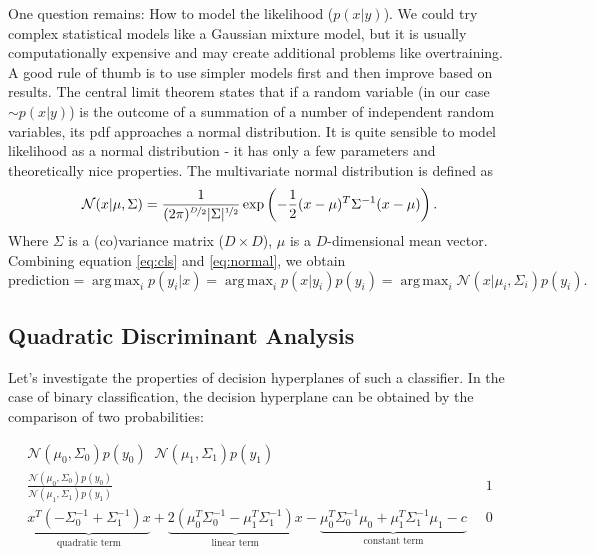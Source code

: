 \documentclass{article}
\DeclareMathOperator*{\argmax}{arg\,max}
\DeclareMathOperator*{\equnk}{\overset{?}<}
\begin{document}
One question remains: How to model the likelihood ($p(x|y)$). 
We could try complex statistical models like a Gaussian mixture model, but it is usually computationally
expensive and may create additional problems like overtraining. 
A good rule of thumb is to use simpler models first and then improve based on results.
The central limit theorem states that if a random variable (in our case $\sim p(x|y)$) 
is the outcome of a summation of a number of independent random variables, its pdf approaches a normal distribution. 
It is quite sensible to model likelihood as a normal distribution - 
it has only a few parameters and theoretically nice properties. 
The multivariate normal distribution is defined as
\begin{equation}
    \label{eq:normal}
    \mathcal{N}(x | \mu, \Sigma) = \frac{1}{
    (2\pi)^{\nicefrac{D}{2}} |\Sigma|^{\nicefrac{1}{2}}} 
    \exp\left(
        -\frac{1}{2}(x - \mu)^T\Sigma^{-1}(x-\mu)
    \right).
\end{equation}
Where $\Sigma$ is a (co)variance matrix ($D\times D$), $\mu$ is a $D$-dimensional mean vector. 
Combining equation \ref{eq:cls} and \ref{eq:normal}, we obtain
\begin{equation}
    \text{prediction} = \argmax_i p(y_i | x) = \argmax_i p(x|y_i) p(y_i) = \argmax_i \mathcal{N}(x|\mu_i, \Sigma_i)  p(y_i).
\end{equation}


\subsection{Quadratic Discriminant Analysis}
Let’s investigate the properties of decision hyperplanes of such a classifier.
In the case of binary classification, the decision hyperplane can be obtained by 
the comparison of two probabilities: 

\begingroup
\allowdisplaybreaks
\begin{align}
    \mathcal{N}(\mu_0, \Sigma_0)  p(y_0) \equnk
    \mathcal{N}(\mu_1, \Sigma_1)  p(y_1) \\
    \frac{
        \mathcal{N}(\mu_0, \Sigma_0)  p(y_0) 
    }{
        \mathcal{N}(\mu_1, \Sigma_1)  p(y_1) 
    } &\equnk 1 \\
        \label{eq:reduce_linear}
        \underbrace{
            x^T \left(
            -\Sigma_0^{-1} + \Sigma_1^{-1}
        \right) x }_{\text{quadratic term}}
        + 
        \underbrace{
        2\left(\mu_0^T\Sigma_0^{-1} - \mu_1^T\Sigma_1^{-1}\right)x}_{\text{linear term}}
        -\underbrace{
         \mu_0^T\Sigma_0^{-1}\mu_0
    + \mu_1^T\Sigma_1^{-1}\mu_1 - c}_{\text{constant term}}
    &\equnk 0
\end{align}
\endgroup
\end{document}
